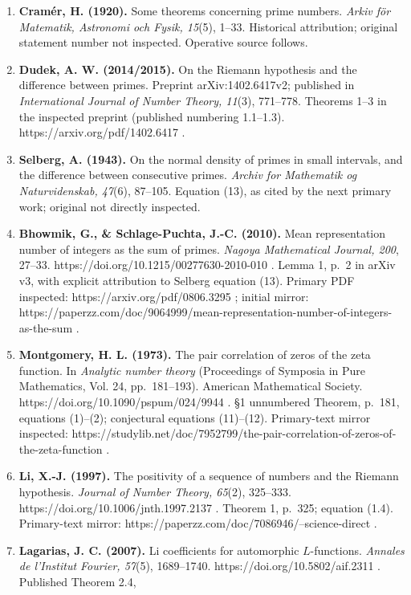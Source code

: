 \begin{enumerate}
  context.
\item
  \textbf{Cramér, H. (1920).} Some theorems concerning prime numbers.
  \emph{Arkiv för Matematik, Astronomi och Fysik, 15}(5), 1--33.
  Historical attribution; original statement number not inspected.
  Operative source follows.
\item
  \textbf{Dudek, A. W. (2014/2015).} On the Riemann hypothesis and the
  difference between primes. Preprint arXiv:1402.6417v2; published in
  \emph{International Journal of Number Theory, 11}(3), 771--778.
  Theorems 1--3 in the inspected preprint (published numbering
  1.1--1.3). https://arxiv.org/pdf/1402.6417 .
\item
  \textbf{Selberg, A. (1943).} On the normal density of primes in small
  intervals, and the difference between consecutive primes. \emph{Archiv
  for Mathematik og Naturvidenskab, 47}(6), 87--105. Equation (13), as
  cited by the next primary work; original not directly inspected.
\item
  \textbf{Bhowmik, G., \& Schlage-Puchta, J.-C. (2010).} Mean
  representation number of integers as the sum of primes. \emph{Nagoya
  Mathematical Journal, 200}, 27--33.
  https://doi.org/10.1215/00277630-2010-010 . Lemma 1, p.~2 in arXiv v3,
  with explicit attribution to Selberg equation (13). Primary PDF
  inspected: https://arxiv.org/pdf/0806.3295 ; initial mirror:
  https://paperzz.com/doc/9064999/mean-representation-number-of-integers-as-the-sum
  .
\item
  \textbf{Montgomery, H. L. (1973).} The pair correlation of zeros of
  the zeta function. In \emph{Analytic number theory} (Proceedings of
  Symposia in Pure Mathematics, Vol. 24, pp.~181--193). American
  Mathematical Society. https://doi.org/10.1090/pspum/024/9944 . §1
  unnumbered Theorem, p.~181, equations (1)--(2); conjectural equations
  (11)--(12). Primary-text mirror inspected:
  https://studylib.net/doc/7952799/the-pair-correlation-of-zeros-of-the-zeta-function
  .
\item
  \textbf{Li, X.-J. (1997).} The positivity of a sequence of numbers and
  the Riemann hypothesis. \emph{Journal of Number Theory, 65}(2),
  325--333. https://doi.org/10.1006/jnth.1997.2137 . Theorem 1, p.~325;
  equation (1.4). Primary-text mirror:
  https://paperzz.com/doc/7086946/--science-direct .
\item
  \textbf{Lagarias, J. C. (2007).} Li coefficients for automorphic
  \(L\)-functions. \emph{Annales de l'Institut Fourier, 57}(5),
  1689--1740. https://doi.org/10.5802/aif.2311 . Published Theorem 2.4,

\end{enumerate}
